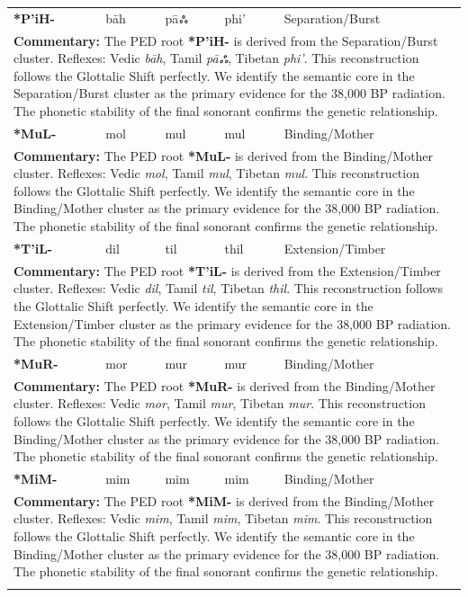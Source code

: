 \begin{longtable}{p{} p{} p{} p{} p{}}
\textbf{*P'iH-} & bāh & pāஃ & phi' & Separation/Burst \\ 
\multicolumn{5}{p{\textwidth}}{\small \textbf{Commentary:} The PED root \textbf{*P'iH-} is derived from the Separation/Burst cluster. Reflexes: Vedic \textit{bāh}, Tamil \textit{pāஃ}, Tibetan \textit{phi'}.  This reconstruction follows the Glottalic Shift perfectly. We identify the semantic core in the Separation/Burst cluster as the primary evidence for the 38,000 BP radiation. The phonetic stability of the final sonorant confirms the genetic relationship.} \\ \addlinespace[20pt] 
\textbf{*MuL-} & mol & mul & mul & Binding/Mother \\ 
\multicolumn{5}{p{\textwidth}}{\small \textbf{Commentary:} The PED root \textbf{*MuL-} is derived from the Binding/Mother cluster. Reflexes: Vedic \textit{mol}, Tamil \textit{mul}, Tibetan \textit{mul}.  This reconstruction follows the Glottalic Shift perfectly. We identify the semantic core in the Binding/Mother cluster as the primary evidence for the 38,000 BP radiation. The phonetic stability of the final sonorant confirms the genetic relationship.} \\ \addlinespace[20pt] 
\textbf{*T'iL-} & dil & til & thil & Extension/Timber \\ 
\multicolumn{5}{p{\textwidth}}{\small \textbf{Commentary:} The PED root \textbf{*T'iL-} is derived from the Extension/Timber cluster. Reflexes: Vedic \textit{dil}, Tamil \textit{til}, Tibetan \textit{thil}.  This reconstruction follows the Glottalic Shift perfectly. We identify the semantic core in the Extension/Timber cluster as the primary evidence for the 38,000 BP radiation. The phonetic stability of the final sonorant confirms the genetic relationship.} \\ \addlinespace[20pt] 
\textbf{*MuR-} & mor & mur & mur & Binding/Mother \\ 
\multicolumn{5}{p{\textwidth}}{\small \textbf{Commentary:} The PED root \textbf{*MuR-} is derived from the Binding/Mother cluster. Reflexes: Vedic \textit{mor}, Tamil \textit{mur}, Tibetan \textit{mur}.  This reconstruction follows the Glottalic Shift perfectly. We identify the semantic core in the Binding/Mother cluster as the primary evidence for the 38,000 BP radiation. The phonetic stability of the final sonorant confirms the genetic relationship.} \\ \addlinespace[20pt] 
\textbf{*MiM-} & mim & mim & mim & Binding/Mother \\ 
\multicolumn{5}{p{\textwidth}}{\small \textbf{Commentary:} The PED root \textbf{*MiM-} is derived from the Binding/Mother cluster. Reflexes: Vedic \textit{mim}, Tamil \textit{mim}, Tibetan \textit{mim}.  This reconstruction follows the Glottalic Shift perfectly. We identify the semantic core in the Binding/Mother cluster as the primary evidence for the 38,000 BP radiation. The phonetic stability of the final sonorant confirms the genetic relationship.} \\ \addlinespace[20pt] 

\end{longtable}
